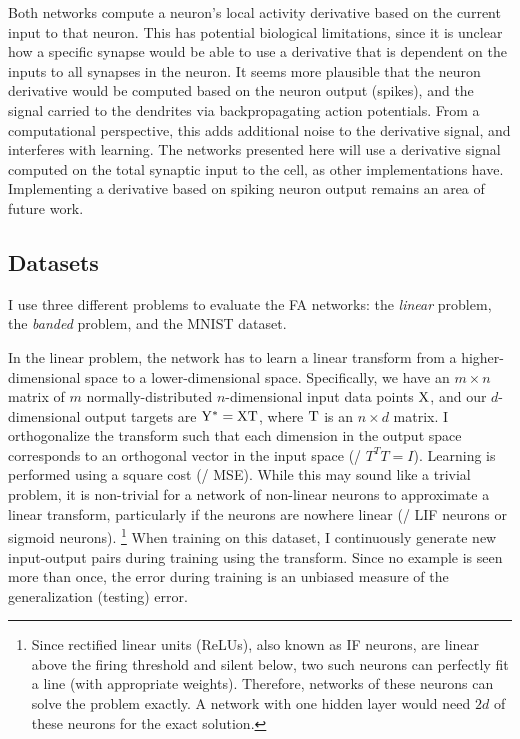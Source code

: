 Both networks compute a neuron's local activity derivative
based on the current input to that neuron.
This has potential biological limitations,
since it is unclear how a specific synapse
would be able to use a derivative
that is dependent on the inputs to all synapses in the neuron.
It seems more plausible that the neuron derivative would be computed
based on the neuron output (spikes),
and the signal carried to the dendrites via backpropagating action potentials.
From a computational perspective,
this adds additional noise to the derivative signal,
and interferes with learning.
The networks presented here will use a derivative signal
computed on the total synaptic input to the cell,
as other implementations have.
Implementing a derivative based on spiking neuron output
remains an area of future work.


\subsection{Datasets}

I use three different problems to evaluate the FA networks:
the \emph{linear} problem, the \emph{banded} problem, and the MNIST dataset.

In the linear problem,
the network has to learn a linear transform
from a higher-dimensional space to a lower-dimensional space.
Specifically, we have an $m \times n$ matrix of $m$ normally-distributed
$n$-dimensional input data points $\mathrm{X}$,
and our $d$-dimensional output targets are $\mathrm{Y}^* = \mathrm{X} \mathrm{T}$,
where $\mathrm{T}$ is an $n \times d$ matrix.
I orthogonalize the transform such that each dimension in the output space
corresponds to an orthogonal vector in the input space (\ie/ $T^T T = I$).
Learning is performed using a square cost (\ie/ MSE).
While this may sound like a trivial problem,
it is non-trivial for a network of non-linear neurons
to approximate a linear transform,
particularly if the neurons are nowhere linear (\eg/ LIF neurons or sigmoid neurons).%
\footnote{Since rectified linear units (ReLUs), also known as IF neurons,
  are linear above the firing threshold and silent below,
  two such neurons can perfectly fit a line (with appropriate weights).
  Therefore, networks of these neurons can solve the problem exactly.
  A network with one hidden layer would need $2d$ of these neurons
  for the exact solution.}
When training on this dataset,
I continuously generate new input-output pairs
during training using the transform.
Since no example is seen more than once,
the error during training is an unbiased measure
of the generalization (testing) error.

